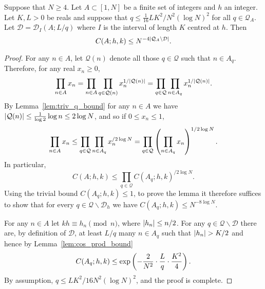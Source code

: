 \begin{lemma}\label{lem:minor2_ind_bound}
Suppose that $N\geq 4$. Let $A\subset [1,N]$ be a finite set of integers and $h$ an integer. Let $K,L>0$ be reals and suppose that $q\leq \tfrac{1}{16}LK^2/N^2(\log N)^2$ for all $q\in \mathcal{Q}_A$. Let $\mathcal{D}=\mathcal{D}_I(A;L/q)$ where $I$ is the interval of length $K$ centred at $h$. Then
\[C(A;h,k)\leq N^{-4\left\lvert \mathcal{Q}_A\backslash\mathcal{D}\right\rvert}.\]
\end{lemma}
\begin{proof}
For any $n\in A$, let $\mathcal{Q}(n)$ denote all those $q\in \mathcal{Q}$ such that $n\in A_q$. Therefore, for any real $x_n\geq 0$,
\[\prod_{n\in A}x_n=\prod_{n\in A}\prod_{q\in \mathcal{Q}(n)}x_n^{1/\left\lvert \mathcal{Q}(n)\right\rvert}
=\prod_{q\in\mathcal{Q}}\prod_{n\in A_q}x_n^{1/\left\lvert \mathcal{Q}(n)\right\rvert}.\]
By Lemma~\ref{lem:triv_q_bound} for any $n\in A$ we have $\left\lvert \mathcal{Q}(n)\right\rvert\leq \tfrac{1}{\log 2}\log n\leq 2\log N$, and so if $0\leq x_n\leq 1$,
\[\prod_{n\in A}x_n\leq \prod_{q\in\mathcal{Q}}\prod_{n\in A_q}x_n^{/2\log N}=\prod_{q\in \mathcal{Q}}\left( \prod_{n\in A_q}x_n\right)^{1/2\log N}.\]
In particular,
 \[C(A;h,k)\leq \prod_{q\in \mathcal{Q}}C(A_q;h,k)^{/2\log N}.\]
 Using the trivial bound $C(A_q;h,k)\leq 1$, to prove the lemma it therefore suffices to show that for every $q\in\mathcal{Q}\backslash\mathcal{D}_h$ we have $C(A_q;h,k)\leq N^{-8\log N}$.

For any $n\in A$ let $kh\equiv h_n\pmod{n}$, where $\left\lvert h_n\right\rvert\leq n/2$. For any $q\in\mathcal{Q}\backslash \mathcal{D}$ there are, by definition of $\mathcal{D}$, at least $L/q$ many $n\in A_q$ such that $\left\lvert h_n\right\rvert>K/2$ and hence by Lemma~\ref{lem:cos_prod_bound}
\[C(A_q;h,k)\leq\exp\left( -\frac{2}{N^2}\cdot \frac{L}{q}\cdot \frac{K^2}{4}\right).\]
By assumption, $q\leq LK^2/16N^2(\log N)^2$, and the proof is complete.
\end{proof}

